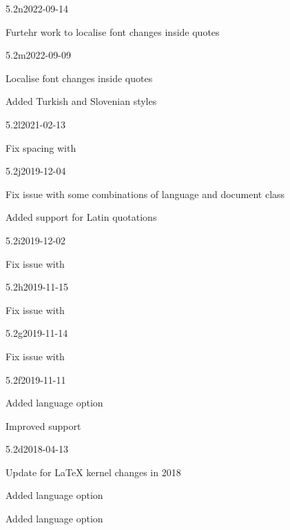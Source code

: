 \documentclass{ltxdockit}[2010/09/26]
\begin{document}
\begin{changelog}

\begin{release}{5.2n}{2022-09-14}
\item Furtehr work to localise font changes inside quotes
\end{release}

\begin{release}{5.2m}{2022-09-09}
\item Localise font changes inside quotes
\item Added Turkish and Slovenian styles
\end{release}


\begin{release}{5.2l}{2021-02-13}
\item Fix spacing with 
\end{release}

\begin{release}{5.2j}{2019-12-04}
\item Fix issue with some combinations of language and document class
\item Added support for Latin quotations
\end{release}


\begin{release}{5.2i}{2019-12-02}
\item Fix issue with 
\end{release}

\begin{release}{5.2h}{2019-11-15}
\item Fix issue with 
\end{release}

\begin{release}{5.2g}{2019-11-14}
\item Fix issue with 
\end{release}

\begin{release}{5.2f}{2019-11-11}
\item Added language option 
\item Improved  support
\end{release}

\begin{release}{5.2d}{2018-04-13}
\item Update for \LaTeX{} kernel changes in 2018
\item Added language option 
\item Added language option 
\end{release}


\end{changelog}
\end{document}
